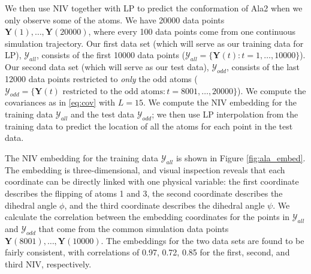 \documentclass[aip,jcp,preprint]{revtex4-1}
\begin{document}

We then use NIV together with LP to predict the conformation of Ala2 when we only observe some of the atoms.
%
We have 20000 data points $\mathbf{Y}(1), \dots, \mathbf{Y}(20000)$, where every 100 data points come from one continuous simulation trajectory.
%
Our first data set (which will serve as our training data for LP), $\mathcal{Y}_{all}$,
consists of the first 10000 data points ($\mathcal{Y}_{all} = \{\mathbf{Y}(t): t=1, \dots, 10000\}$).
%
Our second data set (which will serve as our test data), $\mathcal{Y}_{odd}$, consists of the last 12000 data points restricted to {\em only} the odd atoms
($\mathcal{Y}_{odd} = \{ \mathbf{Y}(t) \text{ restricted to the odd atoms}: t = 8001, \dots, 20000\}$).
%
We compute the covariances as in \eqref{eq:cov} with $L=15$.
%
We compute the NIV embedding for the training data $\mathcal{Y}_{all}$ and the test data $\mathcal{Y}_{odd}$; we then use LP interpolation from the training data to predict the location of all the atoms for each point in the test data.

The NIV embedding for the training data $\mathcal{Y}_{all}$ is shown in Figure \ref{fig:ala_embed}.
%
The embedding is three-dimensional, and visual inspection reveals that each coordinate can be directly linked with one physical variable:
the first coordinate describes the flipping of atoms 1 and 3, the second coordinate describes the dihedral angle $\phi$, and the third coordinate describes the dihedral angle $\psi$.
%
We calculate the correlation between the embedding coordinates for the points in $\mathcal{Y}_{all}$ and $\mathcal{Y}_{odd}$
that come from the common simulation data points $\mathbf{Y}(8001), \dots, \mathbf{Y}(10000)$.
%
The embeddings for the two data sets are found to be fairly consistent, with correlations of 0.97, 0.72, 0.85 for the first, second, and third NIV, respectively.
\end{document}
